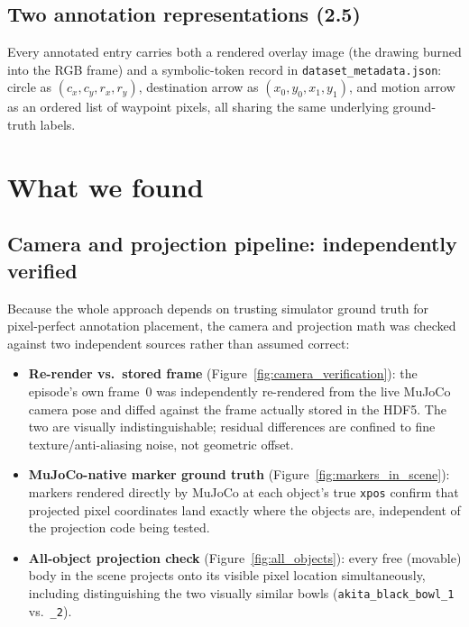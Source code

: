 \documentclass[11pt]{article}
\begin{document}
\subsection{Two annotation representations (2.5)}

Every annotated entry carries both a rendered overlay image (the drawing burned into the RGB frame) and a symbolic-token record in \texttt{dataset\_metadata.json}: circle as $(c_x, c_y, r_x, r_y)$, destination arrow as $(x_0,y_0,x_1,y_1)$, and motion arrow as an ordered list of waypoint pixels, all sharing the same underlying ground-truth labels.

\section{What we found}

\subsection{Camera and projection pipeline: independently verified}

Because the whole approach depends on trusting simulator ground truth for pixel-perfect annotation placement, the camera and projection math was checked against two independent sources rather than assumed correct:

\begin{itemize}[nosep]
  \item \textbf{Re-render vs.\ stored frame} (Figure~\ref{fig:camera_verification}): the episode's own frame~0 was independently re-rendered from the live MuJoCo camera pose and diffed against the frame actually stored in the HDF5. The two are visually indistinguishable; residual differences are confined to fine texture/anti-aliasing noise, not geometric offset.
  \item \textbf{MuJoCo-native marker ground truth} (Figure~\ref{fig:markers_in_scene}): markers rendered directly by MuJoCo at each object's true \texttt{xpos} confirm that projected pixel coordinates land exactly where the objects are, independent of the projection code being tested.
  \item \textbf{All-object projection check} (Figure~\ref{fig:all_objects}): every free (movable) body in the scene projects onto its visible pixel location simultaneously, including distinguishing the two visually similar bowls (\texttt{akita\_black\_bowl\_1} vs.\ \texttt{\_2}).
\end{itemize}
\end{document}
